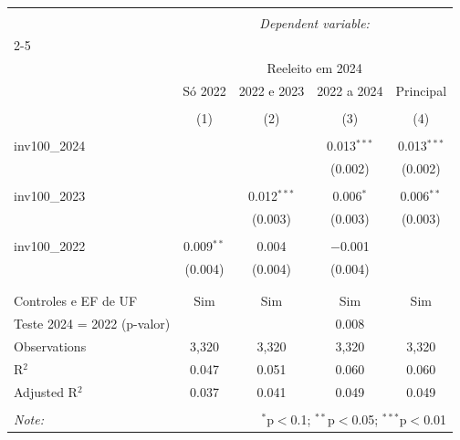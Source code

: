
\begin{table}[!htbp] \centering 
  \caption{} 
  \label{} 
\begin{tabular}{@{\extracolsep{5pt}}lcccc} 
\\[-1.8ex]\hline 
\hline \\[-1.8ex] 
 & \multicolumn{4}{c}{\textit{Dependent variable:}} \\ 
\cline{2-5} 
\\[-1.8ex] & \multicolumn{4}{c}{Reeleito em 2024} \\ 
 & Só 2022 & 2022 e 2023 & 2022 a 2024 & Principal \\ 
\\[-1.8ex] & (1) & (2) & (3) & (4)\\ 
\hline \\[-1.8ex] 
 inv100\_2024 &  &  & 0.013$^{***}$ & 0.013$^{***}$ \\ 
  &  &  & (0.002) & (0.002) \\ 
  & & & & \\ 
 inv100\_2023 &  & 0.012$^{***}$ & 0.006$^{*}$ & 0.006$^{**}$ \\ 
  &  & (0.003) & (0.003) & (0.003) \\ 
  & & & & \\ 
 inv100\_2022 & 0.009$^{**}$ & 0.004 & $-$0.001 &  \\ 
  & (0.004) & (0.004) & (0.004) &  \\ 
  & & & & \\ 
\hline \\[-1.8ex] 
Controles e EF de UF & Sim & Sim & Sim & Sim \\ 
Teste 2024 = 2022 (p-valor) &  &  & 0.008 &  \\ 
Observations & 3,320 & 3,320 & 3,320 & 3,320 \\ 
R$^{2}$ & 0.047 & 0.051 & 0.060 & 0.060 \\ 
Adjusted R$^{2}$ & 0.037 & 0.041 & 0.049 & 0.049 \\ 
\hline 
\hline \\[-1.8ex] 
\textit{Note:}  & \multicolumn{4}{r}{$^{*}$p$<$0.1; $^{**}$p$<$0.05; $^{***}$p$<$0.01} \\ 
\end{tabular} 
\end{table} 
